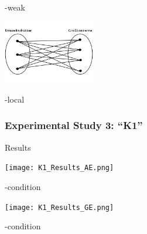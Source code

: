 \documentclass[fleqn,10pt,xcolor=dvipsnames]{beamer}
\begin{document}
\begin{frame}
\begin{minipage}[t]{0.35\linewidth}
\begin{flushright}
      \vspace{-0.7cm}
      \begin{center}
        -weak
      \end{center}
      \includegraphics[width=4cm]{./../../pictures/Umweltschuetzer06.PNG}
      \vspace{-0.7cm}
      \begin{center}
        -local
      \end{center}
    \end{flushright}
  \end{minipage}
\end{frame}


\begin{frame}
  \frametitle{Experimental Study 3: ``K1''}
  \begin{block}{Results}
    \begin{minipage}[t]{0.45\linewidth}
      \vspace{0cm}
      \texttt{[image: K1\_Results\_AE.png]}
      \vspace{-0.6cm}
      \begin{center}
        -condition
      \end{center}
    \end{minipage}
    \hspace{0.3cm}
    \begin{minipage}[t]{0.45\linewidth}
      \vspace{0cm}
      \texttt{[image: K1\_Results\_GE.png]}
      \vspace{-0.6cm}
      \begin{center}
        -condition
      \end{center}
    \end{minipage}
  \end{block}
\end{frame}
\end{document}
